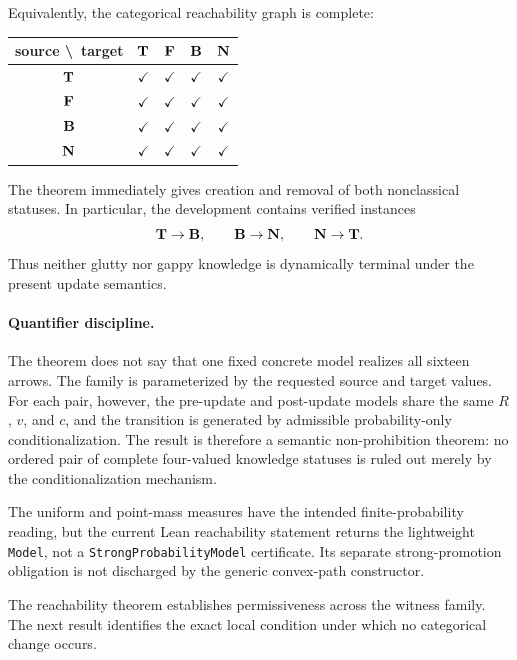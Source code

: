 Equivalently, the categorical reachability graph is complete:

\begin{center}
\begin{tabular}{c|cccc}
\toprule
source \textbackslash\ target & \(\mathbf{T}\) & \(\mathbf{F}\) & \(\mathbf{B}\) & \(\mathbf{N}\)\\
\midrule
\(\mathbf{T}\) & $\checkmark$ & $\checkmark$ & $\checkmark$ & $\checkmark$\\
\(\mathbf{F}\) & $\checkmark$ & $\checkmark$ & $\checkmark$ & $\checkmark$\\
\(\mathbf{B}\) & $\checkmark$ & $\checkmark$ & $\checkmark$ & $\checkmark$\\
\(\mathbf{N}\) & $\checkmark$ & $\checkmark$ & $\checkmark$ & $\checkmark$\\
\bottomrule
\end{tabular}
\end{center}

The theorem immediately gives creation and removal of both nonclassical statuses. In particular, the development contains verified instances
\[
  \mathbf{T}\to\mathbf{B},\qquad
  \mathbf{B}\to\mathbf{N},\qquad
  \mathbf{N}\to\mathbf{T}.
\]
Thus neither glutty nor gappy knowledge is dynamically terminal under the present update semantics.

\paragraph{Quantifier discipline.}
The theorem does not say that one fixed concrete model realizes all sixteen arrows. The family is parameterized by the requested source and target values. For each pair, however, the pre-update and post-update models share the same \(R\), \(v\), and \(c\), and the transition is generated by admissible probability-only conditionalization. The result is therefore a semantic non-prohibition theorem: no ordered pair of complete four-valued knowledge statuses is ruled out merely by the conditionalization mechanism.

The uniform and point-mass measures have the intended finite-probability reading, but the current Lean reachability statement returns the lightweight \texttt{Model}, not a \texttt{StrongProbabilityModel} certificate. Its separate strong-promotion obligation is not discharged by the generic convex-path constructor.

The reachability theorem establishes permissiveness across the witness family. The next result identifies the exact local condition under which no categorical change occurs.
